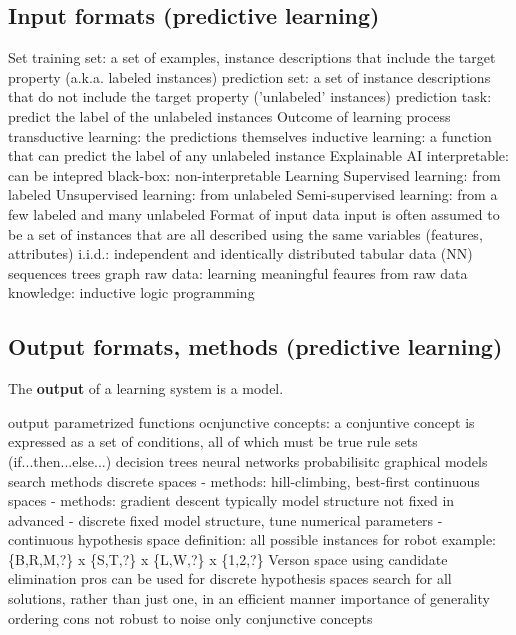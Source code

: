 \subsection{Input formats (predictive learning)}
\begin{outline}
    \1 Set
        \2 training set: a set of examples, instance descriptions that include the target property (a.k.a. labeled instances)
        \2 prediction set: a set of instance descriptions that do not include the target property ('unlabeled' instances)
        \2 prediction task: predict the label of the unlabeled instances
    \1 Outcome of learning process
        \2 transductive learning: the predictions themselves
        \2 inductive learning: a function that can predict the label of any unlabeled instance
    \1 Explainable AI
        \2 interpretable: can be intepred
        \2 black-box: non-interpretable
    \1 Learning
        \2 Supervised learning: from labeled
        \2 Unsupervised learning: from unlabeled
        \2 Semi-supervised learning: from a few labeled and many unlabeled
    \1 Format of input data
        \2 input is often assumed to be a set of instances that are all described using the same variables (features, attributes)
        \2 i.i.d.: independent and identically distributed
            \3 tabular data (NN)
            \3 sequences
            \3 trees
            \3 graph
            \3 raw data: learning meaningful feaures from raw data
            \3 knowledge: inductive logic programming
\end{outline}

\subsection{Output formats, methods (predictive learning)}
The \textbf{output} of a learning system is a model.
\begin{outline}
    \1 output
        \2 parametrized functions
        \2 ocnjunctive concepts: a conjuntive concept is expressed as a set of conditions, all of which must be true
        \2 rule sets (if...then...else...)
        \2 decision trees
        \2 neural networks
        \2 probabilisitc graphical models
    \1 search methods
        \2 discrete spaces - methods: hill-climbing, best-first
        \2 continuous spaces - methods: gradient descent
    \1 typically
        \2 model structure not fixed in advanced - discrete
        \2 fixed model structure, tune numerical parameters - continuous
    \1 hypothesis space
        \2 definition: all possible instances
        \2 for robot example: \{B,R,M,?\} x \{S,T,?\} x \{L,W,?\} x \{1,2,?\}
    \1 Verson space
        \2 using candidate elimination
        \2 pros
            \3 can be used for discrete hypothesis spaces
            \3 search for all solutions, rather than just one, in an efficient manner
            \3 importance of generality ordering
        \2 cons
            \3 not robust to noise
            \3 only conjunctive concepts
\end{outline}


